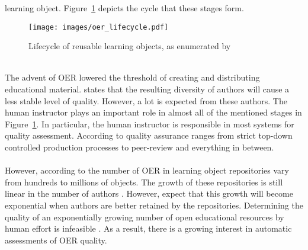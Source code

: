 learning object. Figure~\ref{fig:oer_lifecycle} depicts the cycle that these
stages form.\\
\begin{figure}[h!]
	\centering
	\texttt{[image: images/oer\_lifecycle.pdf]}
	\caption[Lifecycle of reusable learning objects]{Lifecycle of reusable learning objects, as enumerated by \citep{Collis2004}}
	\label{fig:oer_lifecycle}
\end{figure}\\
\noindent
The advent of OER lowered the threshold of creating and distributing
educational material. \citet{Weller2010} states that the resulting diversity of
authors will cause a less stable level of quality. However, a lot is expected
from these authors. The human instructor plays an important role in almost all
of the mentioned stages in Figure~\ref{fig:oer_lifecycle}. In particular, the
human instructor is responsible in most systems for quality assessment.
According to \citep{Camilleri2014} quality assurance ranges from strict
top-down controlled production processes to peer-review and everything in
between.\\\\
\noindent
However, according to \citep{Ochoa2009a} the number of OER in learning object
repositories vary from hundreds to millions of objects. The growth of
these repositories is still linear in the number of authors \citep{Ochoa2009a}.
However, \citeauthor{Ochoa2009a} expect that this growth will become
exponential when authors are better retained by the repositories. Determining
the quality of an exponentially growing number of open educational resources by
human effort is infeasible \citep{Cechinel2011, Ochoa2006, Zemsky2004}.
As a result, there is a growing interest in automatic assessments of OER
quality.
